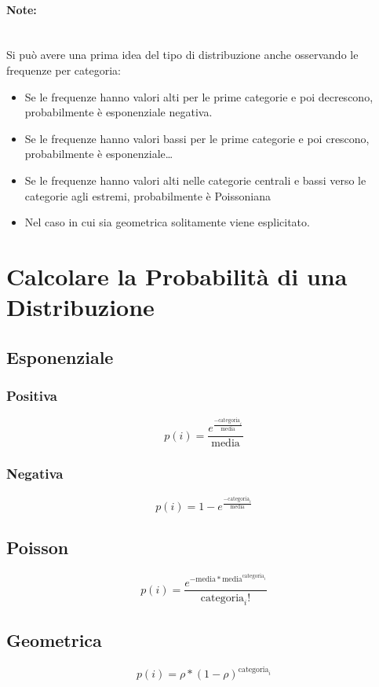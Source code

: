 \paragraph{Note:}\ \\
Si può avere una prima idea del tipo di distribuzione anche
osservando le frequenze per categoria:
\begin{itemize}
      \item Se le frequenze hanno valori alti per le prime categorie e poi
            decrescono, probabilmente è esponenziale negativa.
      \item Se le frequenze hanno valori bassi per le prime categorie e poi
            crescono, probabilmente è esponenziale\dots
      \item Se le frequenze hanno valori alti nelle categorie centrali e bassi
            verso le categorie agli estremi, probabilmente è Poissoniana
      \item Nel caso in cui sia geometrica solitamente viene esplicitato.
\end{itemize}

\section{Calcolare la Probabilità di una Distribuzione} \label{pi}

\subsection{Esponenziale}

\subsubsection{Positiva}

\[
      p(i) = \frac{e^{\frac{- \text{categoria}_i}{\text{media}}}}{\text{media}}
\]

\subsubsection{Negativa}

\[
      p(i) = 1 - e^{\frac{- \text{categoria}_i}{\text{media}}}
\]

\subsection{Poisson}

\[
      p(i) = \frac{e^{- \text{media} * \text{media}^{\text{categoria}_i}}}{\text{categoria}_i !}
\]

\subsection{Geometrica}

\[
      p(i) = \rho * (1 - \rho)^{\text{categoria}_i}
\]